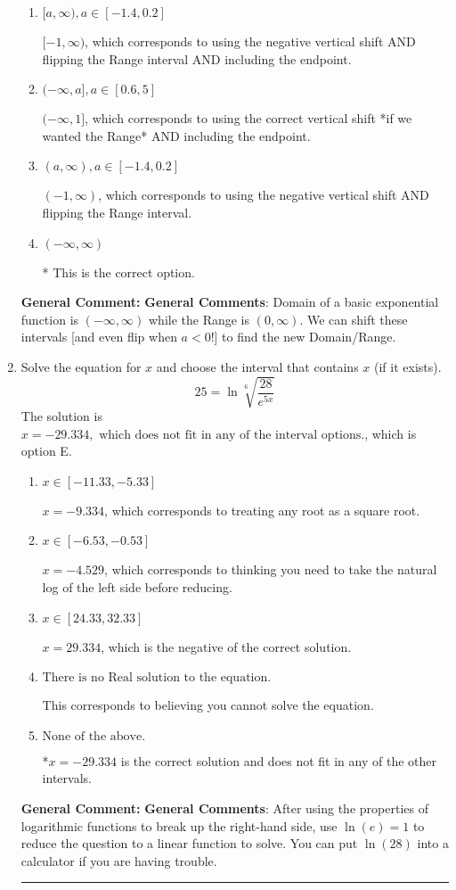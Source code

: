 \documentclass{extbook}[14pt]
\newcommand{\litem}[1]{\item #1

\rule{\textwidth}{0.4pt}}
\begin{document}
\begin{enumerate}
{\begin{enumerate}[label=\Alph*.]
$(-\infty, 1)$, which corresponds to using the correct vertical shift *if we wanted the Range*.
\item \( [a, \infty), a \in [-1.4, 0.2] \)

$[-1, \infty)$, which corresponds to using the negative vertical shift AND flipping the Range interval AND including the endpoint.
\item \( (-\infty, a], a \in [0.6, 5] \)

$(-\infty, 1]$, which corresponds to using the correct vertical shift *if we wanted the Range* AND including the endpoint.
\item \( (a, \infty), a \in [-1.4, 0.2] \)

$(-1, \infty)$, which corresponds to using the negative vertical shift AND flipping the Range interval.
\item \( (-\infty, \infty) \)

* This is the correct option.
\end{enumerate}

\textbf{General Comment:} \textbf{General Comments}: Domain of a basic exponential function is $(-\infty, \infty)$ while the Range is $(0, \infty)$. We can shift these intervals [and even flip when $a<0$!] to find the new Domain/Range.
}
\litem{
 Solve the equation for $x$ and choose the interval that contains $x$ (if it exists).
\[  25 = \ln{\sqrt[6]{\frac{28}{e^{5x}}}} \]
The solution is \( x = -29.334, \text{ which does not fit in any of the interval options.} \), which is option E.\begin{enumerate}[label=\Alph*.]
\item \( x \in [-11.33, -5.33] \)

$x = -9.334$, which corresponds to treating any root as a square root.
\item \( x \in [-6.53, -0.53] \)

$x = -4.529$, which corresponds to thinking you need to take the natural log of the left side before reducing.
\item \( x \in [24.33, 32.33] \)

$x = 29.334$, which is the negative of the correct solution.
\item \( \text{There is no Real solution to the equation.} \)

This corresponds to believing you cannot solve the equation.
\item \( \text{None of the above.} \)

*$x = -29.334$ is the correct solution and does not fit in any of the other intervals.
\end{enumerate}

\textbf{General Comment:} \textbf{General Comments}: After using the properties of logarithmic functions to break up the right-hand side, use $\ln(e) = 1$ to reduce the question to a linear function to solve. You can put $\ln(28)$ into a calculator if you are having trouble.
}
\end{enumerate}
\end{document}

